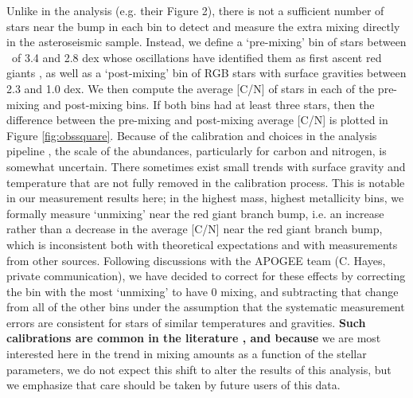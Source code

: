 Unlike in the \citet{Shetrone2019} analysis (e.g. their Figure 2), there is not a sufficient number of stars near the bump in each bin to detect and measure the extra mixing directly in the asteroseismic sample. Instead, we define a `pre-mixing' bin of stars between \logg\ of 3.4 and 2.8 dex whose oscillations have identified them as first ascent red giants \citep{Elsworth2019}, as well as a `post-mixing' bin of RGB stars with surface gravities between 2.3 and 1.0 dex. We then compute the average [C/N] of stars in each of the pre-mixing and post-mixing bins. If both bins had at least three stars, then the difference between the pre-mixing and post-mixing average [C/N] is plotted in Figure \ref{fig:obssquare}. Because of the calibration and choices in the analysis pipeline
\citep[see e.g.][]{Holtzman2018,Jonsson2020, vsmith_apogee_dr16_2021}, the scale of the abundances, particularly for carbon and nitrogen, is somewhat uncertain.
There sometimes exist small trends with surface gravity and temperature that are not fully removed in the calibration process. This is notable in our measurement results here; in the highest mass, highest metallicity bins, we formally measure `unmixing' near the red giant branch bump, i.e. an increase rather than a decrease in the average [C/N] near the red giant branch bump, which is inconsistent both with theoretical expectations and with measurements from other sources. Following discussions with the APOGEE team (C. Hayes, private communication), we have decided to correct for these effects by correcting the bin with the most `unmixing' to have 0 mixing, and subtracting that change from all of the other bins under the assumption that the systematic measurement errors are consistent for stars of similar temperatures and gravities. \textbf{Such calibrations are common in the literature \citep{Holtzman2015, Buder2021}, and because} we are most interested here in the trend in mixing amounts as a function of the stellar parameters, we do not expect this shift to alter the results of this analysis, but we emphasize that care should be taken by future users of this data. 

